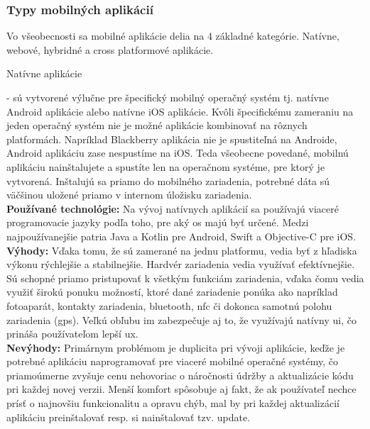 \subsubsection{Typy mobilných aplikácií}
\label{sec:typy aplikacii}
Vo všeobecnosti sa mobilné aplikácie delia na 4 základné kategórie. Natívne, webové, hybridné a cross platformové aplikácie.
\begin{itemize}[leftmargin=*]
{\bf \item Natívne aplikácie} - sú vytvorené výlučne pre špecifický mobilný operačný systém tj. natívne Android aplikácie alebo natívne iOS aplikácie. Kvôli špecifickému zameraniu na jeden operačný systém nie je možné aplikácie kombinovať na rôznych platformách. Napríklad Blackberry aplikácia nie je spustiteľná na Androide, Android aplikáciu zase nespustíme na iOS. Teda všeobecne povedané, mobilnú aplikáciu nainštalujete a spustíte len na operačnom systéme, pre ktorý je vytvorená. Inštalujú sa priamo do mobilného zariadenia, potrebné dáta sú väčšinou uložené priamo v internom úložisku zariadenia. \cite{ma3} \\

{\bf Používané technológie:} Na vývoj natívnych aplikácií sa používajú viaceré programovacie jazyky podľa toho, pre aký \acrshort{os} majú byť určené. Medzi najpoužívanejšie patria Java a Kotlin pre Android, Swift a Objective-C pre iOS. \\

{\bf Výhody:} Vďaka tomu, že sú zamerané na jednu platformu, vedia byť z hľadiska výkonu rýchlejšie a stabilnejšie. Hardvér zariadenia vedia využívať efektívnejšie. Sú schopné priamo pristupovať k všetkým funkciám zariadenia, vďaka čomu vedia využiť širokú ponuku možností, ktoré dané zariadenie ponúka ako napríklad fotoaparát, kontakty zariadenia, bluetooth, \acrshort{nfc} či dokonca samotnú polohu zariadenia (\acrshort{gps}). Veľkú obľubu im zabezpečuje aj to, že využívajú natívny \acrshort{ui}, čo prináša používateľom lepší \acrshort{ux}. \cite{ma3} \\
 
{\bf Nevýhody:} Primárnym problémom je duplicita pri vývoji aplikácie, keďže je potrebné aplikáciu naprogramovať pre viaceré mobilné operačné systémy, čo priamoúmerne zvyšuje cenu nehovoriac o náročnosti údržby a aktualizácie kódu pri každej novej verzii. Menší komfort spôsobuje aj fakt, že ak používateľ nechce prísť o najnovšiu funkcionalitu a opravu chýb, mal by pri každej aktualizácií aplikáciu preinštalovať resp. si nainštalovať tzv. update. \cite{ma3} \\


\end{itemize}
